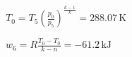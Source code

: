 \( T_0 = T_5 \left( \frac{p_0}{p_5} \right)^{\frac{k-1}{k}} = 288.07 \, \text{K} \)  

\( w_6 = R \frac{T_0 - T_0}{k - n} = -61.2 \, \text{kJ} \)